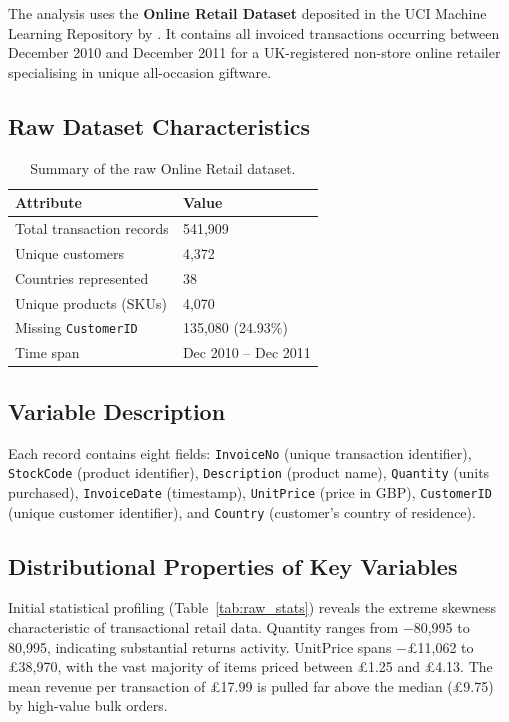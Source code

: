 \documentclass[10pt,a4paper]{article}
\begin{document}
The analysis uses the \textbf{Online Retail Dataset} deposited in the UCI Machine
Learning Repository by \textcite{uci_online_retail}.  It contains all invoiced
transactions occurring between December 2010 and December 2011 for a UK-registered
non-store online retailer specialising in unique all-occasion giftware.

\subsection{Raw Dataset Characteristics}

\begin{table}[H]
  \centering
  \caption{Summary of the raw Online Retail dataset.}
  \label{tab:raw_data}
  \begin{tabular}{ll}
    \toprule
    \textbf{Attribute} & \textbf{Value} \\
    \midrule
    Total transaction records & 541,909 \\
    Unique customers          & 4,372 \\
    Countries represented     & 38 \\
    Unique products (SKUs)     & 4,070 \\
    Missing \texttt{CustomerID} & 135,080 (24.93\%) \\
    Time span                 & Dec 2010 -- Dec 2011 \\
    \bottomrule
  \end{tabular}
\end{table}

\clearpage
\subsection{Variable Description}

Each record contains eight fields: \texttt{InvoiceNo} (unique transaction identifier),
\texttt{StockCode} (product identifier), \texttt{Description} (product name),
\texttt{Quantity} (units purchased), \texttt{InvoiceDate} (timestamp),
\texttt{UnitPrice} (price in GBP), \texttt{CustomerID} (unique customer identifier),
and \texttt{Country} (customer's country of residence).

\subsection{Distributional Properties of Key Variables}

Initial statistical profiling (Table~\ref{tab:raw_stats}) reveals the extreme skewness
characteristic of transactional retail data.  Quantity ranges from $-$80,995 to 80,995,
indicating substantial returns activity.  UnitPrice spans $-$\pounds11,062 to
\pounds38,970, with the vast majority of items priced between \pounds1.25 and \pounds4.13.
The mean revenue per transaction of \pounds17.99 is pulled far above the median
(\pounds9.75) by high-value bulk orders.
\end{document}
